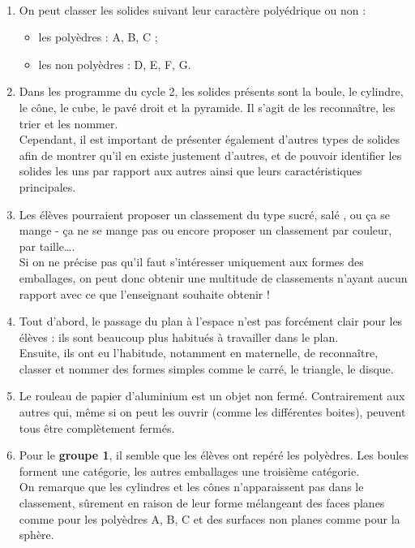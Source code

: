 \begin{corrige}
\ \\ [-5mm]
\begin{enumerate}
   \item On peut classer les solides suivant leur caractère polyédrique ou non :
   \begin{itemize}
      \item les polyèdres : A, B, C ;
      \item les non polyèdres : D, E, F, G. 
   \end{itemize}
   \item Dans les programme du cycle 2, les solides présents sont la boule, le cylindre, le cône, le cube, le pavé droit et la pyramide. Il s'agit de les reconnaître, les trier et les nommer. \\
   Cependant, il est important de présenter également d'autres types de solides afin de montrer qu'il en existe justement d'autres, et de pouvoir identifier les solides les uns par rapport aux autres ainsi que leurs caractéristiques principales. 
   \item Les élèves pourraient proposer un classement du type \og sucré, salé \fg{}, ou \og ça se mange - ça ne se mange pas \fg{} ou encore proposer un classement par couleur, par taille\dots. \\
   Si on ne précise pas qu'il faut s'intéresser uniquement aux formes des emballages, on peut donc obtenir une multitude de classements n'ayant aucun rapport avec ce que l'enseignant souhaite obtenir !
     \item Tout d'abord, le passage du plan à l'espace n'est pas forcément clair pour les élèves : ils sont beaucoup plus habitués à travailler dans le plan. \\
     Ensuite, ils ont eu l'habitude, notamment en maternelle, de reconnaître, classer et nommer des formes simples comme le carré, le triangle, le disque.
   \item Le rouleau de papier d'aluminium est un objet non fermé. Contrairement aux autres qui, même si on peut les ouvrir (comme les différentes boites), peuvent tous être complètement fermés.
   \item Pour le \textbf{groupe 1}, il semble que les élèves ont \og repéré \fg{} les polyèdres. Les boules forment une catégorie, les autres emballages une troisième catégorie. \\
   On remarque que les cylindres et les cônes n'apparaissent pas dans le classement, sûrement en raison de leur forme mélangeant des faces planes comme pour les polyèdres A, B, C et des surfaces non planes comme pour la sphère.  \\

\end{enumerate}
\end{corrige}
